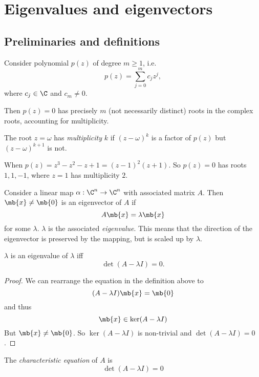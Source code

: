 \documentclass[a4paper]{article}
\begin{document}
\section{Eigenvalues and eigenvectors}
\subsection{Preliminaries and definitions}
\begin{thm}
  Consider polynomial $p(z)$ of degree $m \geq 1$, i.e.
  \[
  p(z) = \sum_{j = 0}^m c_jz^j,
  \]
  where $c_j\in \C$ and $c_m \not= 0$.

  Then $p(z) = 0$ has precisely $m$ (not necessarily distinct) roots in the complex roots, accounting for multiplicity.
\end{thm}

\begin{defi}
  The root $z = \omega$ has \emph{multiplicity} $k$ if $(z - \omega)^k$ is a factor of $p(z)$ but $(z - \omega)^{k + 1}$ is not.
\end{defi}

\begin{eg}
  When $p(z) = z^3 - z^2 - z + 1 = (z - 1)^2(z + 1)$. So $p(z) = 0$ has roots $1, 1, -1$, where $z = 1$ has multiplicity $2$.
\end{eg}

\begin{defi}
  Consider a linear map $\alpha: \C^n\to \C^n$ with associated matrix $A$. Then $\mb{x}\not= \mb{0}$ is an eigenvector of $A$ if
  \[
  A\mb{x} = \lambda\mb{x}
  \]
  for some $\lambda$. $\lambda$ is the associated \emph{eigenvalue}. This means that the direction of the eigenvector is preserved by the mapping, but is scaled up by $\lambda$.
\end{defi}

\begin{thm}
  $\lambda$ is an eigenvalue of $\lambda$ iff
  \[
  \det(A - \lambda I) = 0.
  \]
\end{thm}

\begin{proof}
  We can rearrange the equation in the definition above to
  \[
  (A - \lambda I)\mb{x} = \mb{0}
  \]
  and thus
  \[
  \mb{x}\in \ker(A - \lambda I)
  \]
  But $\mb{x}\not= \mb{0}$. So $\ker(A - \lambda I)$ is non-trivial and $\det(A - \lambda I) = 0$.
\end{proof}

\begin{defi}
  The \emph{characteristic equation} of $A$ is
  \[
  \det(A - \lambda I) = 0
  \]
\end{defi}
\end{document}
